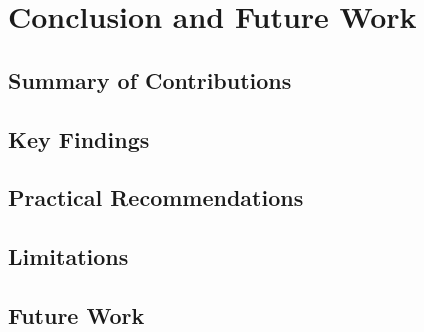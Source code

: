 \chapter{Conclusion and Future Work}
\label{chap:conclusion}


\section{Summary of Contributions}

\section{Key Findings}

\section{Practical Recommendations}

\section{Limitations}

\section{Future Work}
